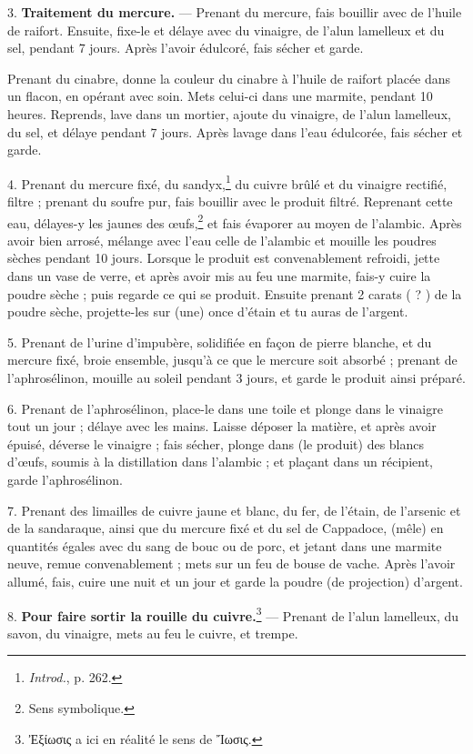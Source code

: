 \documentclass[a4paper, 11pt, oneside, polutonikogreek, french]{article}
\begin{document}
3. \textbf{Traitement du mercure.} --- Prenant du mercure, fais bouillir avec de l'huile de raifort. Ensuite, fixe-le et délaye avec du vinaigre, de l'alun lamelleux et du sel, pendant 7 jours. Après l'avoir édulcoré, fais sécher et garde.

Prenant du cinabre, donne la couleur du cinabre à l'huile de raifort placée dans un flacon, en opérant avec soin. Mets celui-ci dans une marmite, pendant 10 heures. Reprends, lave dans un mortier, ajoute du vinaigre, de l'alun lamelleux, du sel, et délaye pendant 7 jours. Après lavage dans l'eau édulcorée, fais sécher et garde.

4. Prenant du mercure fixé, du sandyx,\footnote{\emph{Introd.}, p. 262.} du cuivre brûlé et du vinaigre rectifié, filtre ; prenant du soufre pur, fais bouillir avec le produit filtré. Reprenant cette eau, délayes-y les jaunes des œufs,\footnote{Sens symbolique.} et fais évaporer au moyen de l'alambic. Après avoir bien arrosé, mélange avec l'eau celle de l'alambic et mouille les poudres sèches pendant 10 jours. Lorsque le produit est convenablement refroidi, jette dans un vase de verre, et après avoir mis au feu une marmite, fais-y cuire la poudre sèche ; puis regarde ce qui se produit. Ensuite prenant 2 carats ( ? ) de la poudre sèche, projette-les sur (une) once d'étain et tu auras de l'argent.

5. Prenant de l'urine d'impubère, solidifiée en façon de pierre blanche, et du mercure fixé, broie ensemble, jusqu'à ce que le mercure soit absorbé ; prenant de l'aphrosélinon, mouille au soleil pendant 3 jours, et garde le produit ainsi préparé.

6. Prenant de l'aphrosélinon, place-le dans une toile et plonge dans le vinaigre tout un jour ; délaye avec les mains. Laisse déposer la matière, et après avoir épuisé, déverse le vinaigre ; fais sécher, plonge dans (le produit) des blancs d'œufs, soumis à la distillation dans l'alambic ; et plaçant dans un récipient, garde l'aphrosélinon.

7. Prenant des limailles de cuivre jaune et blanc, du fer, de l'étain, de l'arsenic et de la sandaraque, ainsi que du mercure fixé et du sel de Cappadoce, (mêle) en quantités égales avec du sang de bouc ou de porc, et jetant dans une marmite neuve, remue convenablement ; mets sur un feu de bouse de vache. Après l'avoir allumé, fais, cuire une nuit et un jour et garde la poudre (de projection) d'argent.

8. \textbf{Pour faire sortir la rouille du cuivre.}\footnote{Ἐξίωσις a ici en réalité le sens de Ἴωσις.} --- Prenant de l'alun lamelleux, du savon, du vinaigre, mets au feu le cuivre, et trempe.
\end{document}
